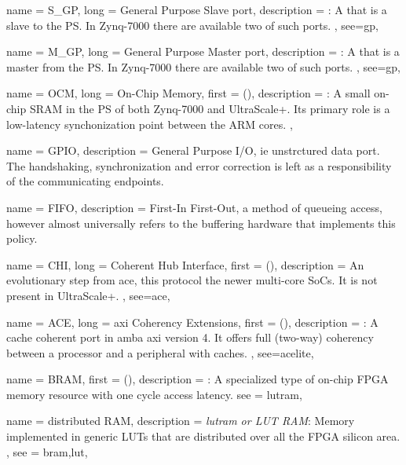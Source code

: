 {
	name = {S\_GP},
	long = {General Purpose Slave port},
	description = {\emph{}:
		A  that is a slave to the PS. 
		In Zynq-7000 there are available two of such ports.
	},
	see={gp},
}

{
	name = {M\_GP},
	long = {General Purpose Master port},
	description = {\emph{}:
		A  that is a master from the PS. 
		In Zynq-7000 there are available two of such ports.
	},
	see={gp},
}

{
	name = {OCM},
	long = {On-Chip Memory},
	first = { ()},
	description = {\emph{}:
		A small on-chip SRAM in the PS of both Zynq-7000 and UltraScale+.
		Its primary role is a low-latency synchonization point between the ARM cores.
	},
}

{
	name = {GPIO},
	description = {
		General Purpose I/O, ie unstrctured data port. 
		The handshaking, synchronization and error correction
		is left as a responsibility of the communicating endpoints.
	}
}

{
	name = {FIFO},
	description = {
		First-In First-Out, a method of queueing access,
		however almost universally refers to the buffering hardware
		that implements this policy.
	}
}


{
	name = {CHI},
	long = {Coherent Hub Interface},
	first = { ()},
	description = {
		An evolutionary step from \gls{ace}, this protocol the newer multi-core SoCs.
		It is not present in UltraScale+.
	},
	see={ace},
}

{
	name = {ACE},
	long = {\gls{axi} Coherency Extensions},
	first = { ()},
	description = {\emph{}:
		A cache coherent port in \gls{amba} \gls{axi} version 4. It offers full (two-way)
		coherency between a processor and a peripheral with caches.
	},
	see={acelite},
}

{
	name = {BRAM},
	first = { ()},
	description = {\emph{}:
		A specialized type of on-chip FPGA memory resource with one cycle access latency.
	}
	see = {lutram},
}

{
	name = {distributed RAM},
	description = {\emph{\Gls{lutram} or LUT RAM}:
		Memory implemented in generic LUTs that are distributed over all the FPGA silicon area.
	},
	see = {bram,lut},
}


